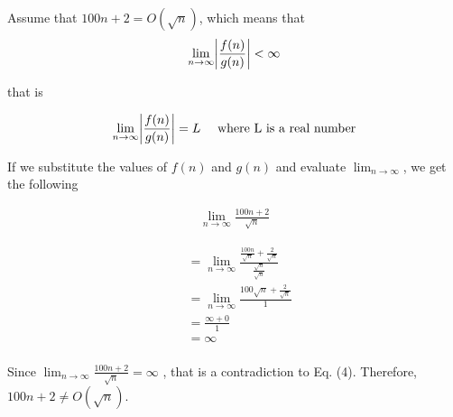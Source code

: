 \documentclass[12pt]{article}
\DeclarePairedDelimiter\abs{\lvert}{\rvert}
\begin{document}
Assume that $100n + 2 = O(\sqrt{n})$, which means that
\begin{align*}
\lim_{n\to\infty} \abs*{\frac{f(n)}{g(n)}} <\infty
\end{align*}

that is 

\begin{align*}
\lim_{n\to\infty} \abs*{\frac{f(n)}{g(n)}} = L \text{~~~ where L is a real number}\\
\end{align*}

If we substitute the values of $f(n)$ and $g(n)$ and evaluate $\lim_{n\to\infty}$, we get the following

\begin{align}
\lim_{n\to\infty} \frac{100n + 2}{\sqrt{n}}
\end{align}


\begin{align*}
&= \lim_{n\to\infty} \frac{\frac{100n}{\sqrt{n}} + \frac{2}{\sqrt{n}}}{\frac{\sqrt{n}}{\sqrt{n}}}\\[10pt]
&= \lim_{n\to\infty} \frac{100\sqrt{n} + \frac{2}{\sqrt{n}}}{1}\\[10pt]
&= \frac{\infty + 0}{1}\\[10pt]
&= \infty\\[10pt]
\end{align*}

Since $\lim_{n\to\infty} \frac{100n + 2}{\sqrt{n}} = \infty$ , that is a contradiction to Eq. (4). Therefore, $100n + 2 \neq O(\sqrt{n}).$\\
\end{document}
